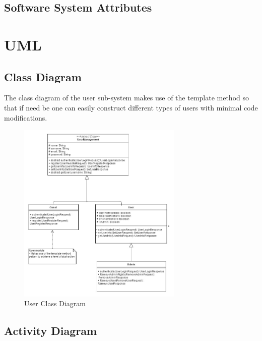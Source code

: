 \subsection{Software System Attributes} %


\section{UML}
\subsection{Class Diagram}
The class diagram of the user sub-system makes use of the template method so that if need be one can easily construct different types of users with minimal code modifications.


\begin{figure}[H]
	\centering
	\includegraphics[width=0.7\textwidth]{user/img/UserClassDiagram.jpg}
	\caption{User Class Diagram}
\end{figure}



%
%
%
\subsection{Activity Diagram}

